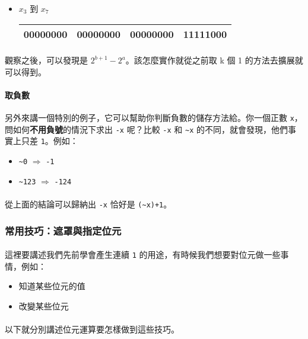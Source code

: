 \documentclass[12pt,a4paper,oneside]{article}
\begin{document}
\begin{CJK}{UTF8}{bkai}
\begin{itemize}
\item $x_3$ 到 $x_7$
\begin{table}[h!]
\centering
\begin{tabular}{|c|c|c|c|}
\hline
00000000 & 00000000 & 00000000 & \textbf{11111}000\\
\hline
\end{tabular}
\end{table}
\end{itemize}

\paragraph{}觀察之後，可以發現是 $2^{b+1}-2^a$。該怎麼實作就從之前取 k 個 1 的方法去擴展就可以得到。
\paragraph{取負數}另外來講一個特別的例子，它可以幫助你判斷負數的儲存方法給。你一個正數 \lstinline!x!，問如何\textbf{不用負號}的情況下求出 \lstinline!-x! 呢？比較 \lstinline!-x! 和 \lstinline!~x! 的不同，就會發現，他們事實上只差 \lstinline!1!。例如：
\begin{itemize}
\item \lstinline!~0! $\Rightarrow$ \lstinline!-1!
\item \lstinline!~123! $\Rightarrow$ \lstinline!-124!
\end{itemize}

\paragraph{}從上面的結論可以歸納出 \lstinline!-x! 恰好是 \lstinline!(~x)+1!。

\subsubsection{常用技巧：遮罩與指定位元}

\paragraph{}這裡要講述我們先前學會產生連續 \lstinline!1! 的用途，有時候我們想要對位元做一些事情，例如：
\begin{itemize}
\item 知道某些位元的值
\item 改變某些位元
\end{itemize}
\paragraph{}以下就分別講述位元運算要怎樣做到這些技巧。

\end{CJK}
\end{document}
